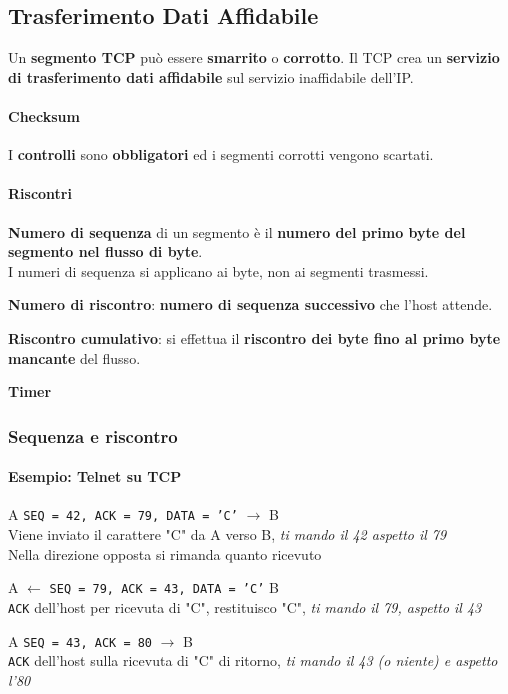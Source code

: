 \documentclass[10pt]{article}
\begin{document}
\subsection{Trasferimento Dati Affidabile}
Un \textbf{segmento TCP} può essere \textbf{smarrito} o \textbf{corrotto}. Il TCP crea un \textbf{servizio di trasferimento dati affidabile} sul servizio inaffidabile dell'IP.
\paragraph{Checksum} I \textbf{controlli} sono \textbf{obbligatori} ed i segmenti corrotti vengono scartati.
\paragraph{Riscontri}
\begin{list}{}{}
\item \textbf{Numero di sequenza} di un segmento è il \textbf{numero del primo byte del segmento nel flusso di byte}.\\I numeri di sequenza si applicano ai byte, non ai segmenti trasmessi.
\item \textbf{Numero di riscontro}: \textbf{numero di sequenza successivo} che l'host attende.
\item \textbf{Riscontro cumulativo}: si effettua il \textbf{riscontro dei byte fino al primo byte mancante} del flusso.
\item \textbf{Timer}
\end{list}
\subsubsection{Sequenza e riscontro}
\paragraph{Esempio: Telnet su TCP}
	\begin{list}{}{}
	\item A \texttt{SEQ = 42, ACK = 79, DATA = 'C'} $\longrightarrow$ B\\
	Viene inviato il carattere "C" da A verso B, \textit{ti mando il 42 aspetto il 79}\\
	Nella direzione opposta si rimanda quanto ricevuto
	\item A $\longleftarrow$ \texttt{SEQ = 79, ACK = 43, DATA = 'C'} B\\
	\texttt{ACK} dell'host per ricevuta di "C", restituisco "C", \textit{ti mando il 79, aspetto il 43}
	\item A \texttt{SEQ = 43, ACK = 80} $\longrightarrow$ B\\
	\texttt{ACK} dell'host sulla ricevuta di "C" di ritorno, \textit{ti mando il 43 (o niente) e aspetto l'80}
	\end{list}
\end{document}
